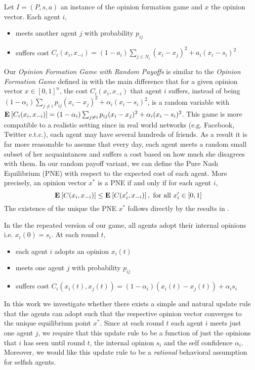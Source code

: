 \begin{definition}\label{d:random_payoff_game}
  Let $I=(P,s,a)$ an instance of the opinion formation game
  and $x$ the opinion vector. Each agent $i$,
  \begin{itemize}
    \item meets another agent $j$ with probability $p_{ij}$
    \item suffers cost
      $C_i(x_i,x_{-i}) = (1-a_i)\sum_{j \in N_i}(x_i-x_j)^2 + a_i(x_i-s_i)^2$
  \end{itemize}
\end{definition}
\noindent Our \emph{Opinion Formation Game with Random Payoffs} is similar to
the \emph{Opinion Formation Game} defined in \cite{BKO11} with the main difference that
for a given opinion vector $x \in [0,1]^n$, the cost $C_i(x_i,x_{-i})$ that agent $i$ 
suffers, instead of being $(1-\alpha_i)\sum_{j \neq i}p_{ij}(x_i-x_j)^2 + \alpha_i(x_i-s_i)^2$,
is a random variable with $\bm{\mathrm{E}}_{} \left[ C_i(x_i,x_{-i}) \right]=(1-\alpha_i)\sum_{j \neq i}p_{ij}(x_i-x_j)^2 + \alpha_i(x_i-s_i)^2$. 
This game is more compatible to a realistic setting since
in real world networks (e.g. Facebook, Twitter e.t.c.), each agent may have
several hundreds of friends. As a result it is far more reasonable to assume that
every day, each agent meets a random small subset of her acquaintances and
suffers a cost based on how much she disagrees with them.
In our random payoff variant, we can define
the Pure Nash Equilibrium (PNE) with respect to the expected cost of each agent.
More precisely, an opinion vector $x^*$ is a PNE if and only if for each agent $i$,
\[\Exp{C(x_i, x_{-i})} \leq \Exp{C(x_i', x_{-i})}, \text{ for all }x_i' \in [0,1]\]
The existence of the unique the PNE $x^*$ follows directly by the results in \cite{BKO11}.

\noindent In the the repeated version of our game, all agents adopt their internal opinions i.e. $x_i(0)=s_i$. 
At each round $t$,
\begin{itemize}
 \item each agent $i$ adopts an opinion $x_i(t)$
 \item meets one agent $j$ with probability $p_{ij}$
 \item suffers cost $C_i(x_i(t),x_j(t)) = (1-\alpha_i)(x_i(t)-x_j(t)) +\alpha_is_i$
\end{itemize}

\noindent In this work we investigate whether there exists a simple and natural update rule that the agents can 
adopt such that the respective opinion vector converges to the unique equilibrium point $x^*$.
Since at each round $t$ each agent $i$ meets just one agent $j$, we require that this update
rule to be a function of just the opinions that $i$ has seen until round $t$, the internal opinion 
$s_i$ and the self confidence $\alpha_i$. Moreover, we would like this update rule to be 
a \emph{rational} behavioral assumption for selfish agents.

